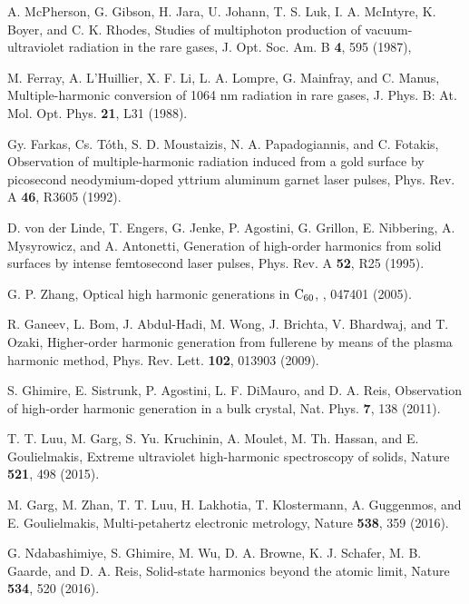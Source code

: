 \documentclass[checkin,showpacs,psfig,aps,pra]{revtex4}
\begin{document}
\begin{thebibliography}{99}
%

A. McPherson, G. Gibson, H. Jara, U. Johann,
T. S. Luk, I. A. McIntyre, K. Boyer, and C. K. Rhodes, {Studies of
multiphoton production of vacuum-ultraviolet radiation in the rare
gases}, J. Opt. Soc. Am. B {\bf 4}, 595 (1987),

M. Ferray, A. L'Huillier, X. F.  Li, L. A. Lompre,
G. Mainfray, and C. Manus, {Multiple-harmonic conversion of 1064 nm
radiation in rare gases},  J. Phys. B: At. Mol. Opt. Phys. {\bf 21},
L31 (1988).

 Gy. Farkas, Cs. T\'{o}th, S. D. Moustaizis,
N. A. Papadogiannis, and C. Fotakis, {Observation of
multiple-harmonic radiation induced from a gold surface by
picosecond neodymium-doped yttrium aluminum garnet laser pulses},
Phys. Rev. A {\bf 46}, R3605 (1992).

 D. von der Linde, T. Engers, G. Jenke,
P. Agostini, G. Grillon, E. Nibbering, A. Mysyrowicz, and
A. Antonetti, {Generation of high-order harmonics from solid
surfaces by intense femtosecond laser pulses}, Phys. Rev. A {\bf    52}, R25 (1995).

 G. P. Zhang, {Optical high harmonic generations in
$\rm C_{60}$}, , 047401 (2005).

 R. Ganeev, L. Bom, J. Abdul-Hadi, M. Wong,
J. Brichta, V. Bhardwaj, and T. Ozaki, {Higher-order harmonic
generation from fullerene by means of the plasma harmonic method},
Phys. Rev. Lett. {\bf 102}, 013903 (2009).

 S. Ghimire, E. Sistrunk, P. Agostini,
L. F. DiMauro, and D. A. Reis, {Observation of high-order harmonic
generation in a bulk crystal}, Nat. Phys. {\bf 7}, 138
(2011).

T. T. Luu, M. Garg, S. Yu. Kruchinin, A. Moulet,
M. Th. Hassan, and E. Goulielmakis, {Extreme ultraviolet
high-harmonic spectroscopy of solids}, Nature {\bf 521}, 498 (2015).

M. Garg, M. Zhan, T. T. Luu, H. Lakhotia,
T. Klostermann, A. Guggenmos, and E. Goulielmakis, {Multi-petahertz
electronic metrology}, Nature {\bf 538}, 359 (2016).

 G. Ndabashimiye, S. Ghimire, M. Wu, D.  A. Browne,
K. J. Schafer, M.  B. Gaarde, and D. A. Reis, {Solid-state harmonics
beyond the atomic limit}, Nature {\bf 534}, 520 (2016).


\end{thebibliography}
\end{document}
